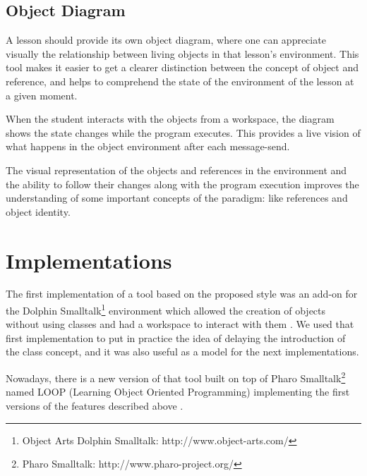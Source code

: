 \documentclass{sigplanconf}
\begin{document}
\subsection{Object Diagram}

A lesson should provide its own object diagram, where one can appreciate
visually the relationship between living objects in that lesson’s environment.
This tool makes it easier to get a clearer distinction between the concept of object and reference, and helps to comprehend the state of the environment of the lesson at a given moment. 

When the student interacts with the objects from a workspace, the diagram shows the state changes while the program executes. This provides a live vision of what happens in the object environment after each message-send. 

The visual representation of the objects and references in the environment and the ability to follow their changes along with the program execution improves the understanding of some important concepts of the paradigm: like references and object identity.

\section{Implementations}

The first implementation of a tool based on the proposed style was an add-on for the Dolphin Smalltalk\footnote{Object Arts Dolphin Smalltalk: http://www.object-arts.com/} environment which allowed the creation of objects without using classes and had a workspace to interact with them \cite{Lomb07}.  We used that first implementation to put in practice the idea of delaying the introduction of the class concept, and it was also useful as a model for the next implementations.

\bigskip
Nowadays, there is a new version of that tool built on top of Pharo Smalltalk\footnote{Pharo Smalltalk: http://www.pharo-project.org/} named LOOP  (Learning Object Oriented Programming) implementing the first versions of the features described above \cite{Lomb07}.
\end{document}
